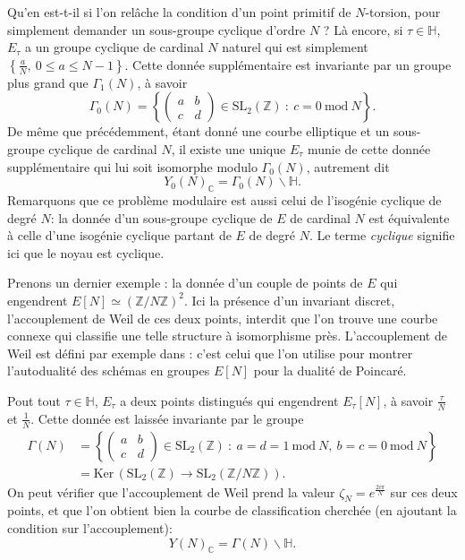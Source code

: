 \documentclass[11pt,a4paper]{article}
\newcommand{\Z}{\mathbb{Z}}
\newcommand{\C}{\mathbb{C}}
\renewcommand{\H}{\mathbb{H}}
\renewcommand{\b}{\backslash}
\newcommand{\Ker}{\mathrm{Ker}\,}
\renewcommand{\mod}{\ \mathrm{mod}\ }
\renewcommand{\v}{\vspace{5mm}}
\theoremstyle{definition}
\begin{document}
Qu'en est-t-il si l'on relâche la condition d'un point primitif de $N$-torsion, pour simplement demander un sous-groupe cyclique d'ordre $N$ ? Là encore, si $\tau\in \H$, $E_\tau$ a un groupe cyclique de cardinal $N$ naturel qui est simplement $\left\{\frac{a}{N},\ 0\leq a\leq N-1\right\}$. Cette donnée supplémentaire est invariante par un groupe plus grand que $\Gamma_1(N)$, à savoir
$$\Gamma_0(N) = \left\{\left(
\begin{matrix}
a & b \\
c & d
\end{matrix}
\right) \in \mathrm{SL}_2(\Z)\ :\ c = 0\mod{N}\right\}.$$
De même que précédemment, étant donné une courbe elliptique et un sous-groupe cyclique de cardinal $N$, il existe une unique $E_\tau$ munie de cette donnée supplémentaire qui lui soit isomorphe modulo $\Gamma_0(N)$, autrement dit
$$Y_0(N)_\C = \Gamma_0(N) \b \H.$$
Remarquons que ce problème modulaire est aussi celui de l'isogénie cyclique de degré $N$: la donnée d'un sous-groupe cyclique de $E$ de cardinal $N$ est équivalente à celle d'une isogénie cyclique partant de $E$ de degré $N$. Le terme \emph{cyclique} signifie ici que le noyau est cyclique.
\v

Prenons un dernier exemple : la donnée d'un couple de points de $E$ qui engendrent $E[N] \simeq (\Z/N\Z)^2$. Ici la présence d'un invariant discret, l'accouplement de Weil de ces deux points, interdit que l'on trouve une courbe connexe qui classifie une telle structure à isomorphisme près. L'accouplement de Weil est défini par exemple dans \cite{Sil1}: c'est celui que l'on utilise pour montrer l'autodualité des schémas en groupes $E[N]$ pour la dualité de Poincaré.

Pout tout $\tau\in \H$, $E_\tau$ a deux points distingués qui engendrent $E_\tau[N]$, à savoir $\frac{\tau}{N}$ et $\frac{1}{N}$. Cette donnée est laissée invariante par le groupe
$$\begin{aligned}
\Gamma(N) &= \left\{\left(
\begin{matrix}
a & b \\
c & d
\end{matrix}
\right) \in \mathrm{SL}_2(\Z)\ :\ a = d = 1 \mod{N},\ b = c = 0\mod{N}\right\} \\
 &= \Ker(\mathrm{SL}_2(\Z) \to \mathrm{SL}_2(\Z/N\Z)).
\end{aligned}$$
On peut vérifier que l'accouplement de Weil prend la valeur $\zeta_N = e^\frac{2 i \pi}{N}$ sur ces deux points, et que l'on obtient bien la courbe de classification cherchée (en ajoutant la condition sur l'accouplement):
$$Y(N)_\C = \Gamma(N) \b \H.$$
\end{document}
